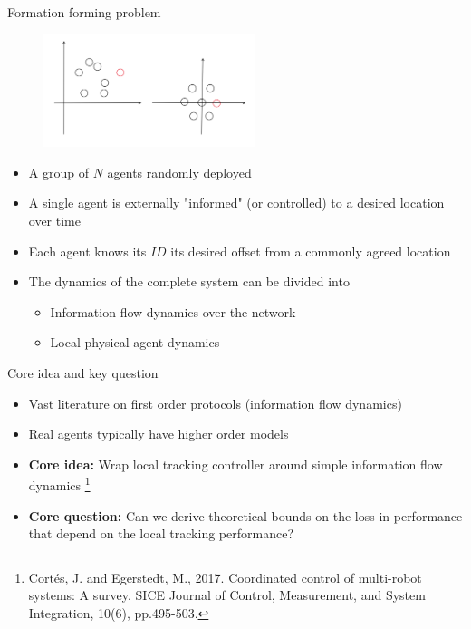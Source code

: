 \begin{frame}{Formation forming problem}
\begin{figure}
	\includegraphics[width=0.55\textwidth]{figures/formation_control_schematic.png}
\end{figure}
\begin{itemize}
	\item A group of $N$ agents randomly deployed
	\item A single agent is externally "informed" (or controlled) to a desired location over time
	\item Each agent knows its $ID$ its desired offset from a commonly agreed location
	\item The dynamics of the complete system can be divided into
	\begin{itemize}
		\item Information flow dynamics over the network
		\item Local physical agent dynamics
	\end{itemize}	
\end{itemize}
\end{frame}
\begin{frame}{Core idea and key question}
	\begin{itemize}
		\item Vast literature on first order protocols (information flow dynamics)
		\item Real agents typically have higher order models
		\item \textbf{Core idea:} Wrap local tracking controller around simple information flow dynamics \footnote{Cortés, J. and Egerstedt, M., 2017. Coordinated control of multi-robot systems: A survey. SICE Journal of Control, Measurement, and System Integration, 10(6), pp.495-503.}
		\item \textbf{Core question:} Can we derive theoretical bounds on the loss in performance that depend on the local tracking performance?
	\end{itemize}
\end{frame}
